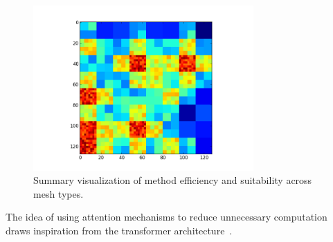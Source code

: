 \begin{figure}[h]
  \centering
  \includegraphics[width=0.75\textwidth]{./images/figure_p13_2.png}
  \caption{Summary visualization of method efficiency and suitability across mesh types.}
  \label{fig:discussion_summary}
\end{figure}

The idea of using attention mechanisms to reduce unnecessary computation draws inspiration from the transformer architecture~\cite{Vaswani2017}.
